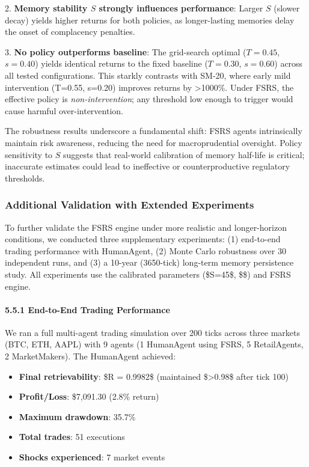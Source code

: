 \documentclass[11pt]{article}
\begin{document}
{{2. \textbf{Memory stability \(S\) strongly influences performance}: Larger \(S\) (slower decay) yields higher returns for both policies, as longer-lasting memories delay the onset of complacency penalties.

3. \textbf{No policy outperforms baseline}: The grid-search optimal (\(T=0.45\), \(s=0.40\)) yields identical returns to the fixed baseline (\(T=0.30\), \(s=0.60\)) across all tested configurations. This starkly contrasts with SM-20, where early mild intervention (T=0.55, s=0.20) improves returns by >1000\%. Under FSRS, the effective policy is \textit{non-intervention}; any threshold low enough to trigger would cause harmful over-intervention.

The robustness results underscore a fundamental shift: FSRS agents intrinsically maintain risk awareness, reducing the need for macroprudential oversight. Policy sensitivity to \(S\) suggests that real-world calibration of memory half-life is critical; inaccurate estimates could lead to ineffective or counterproductive regulatory thresholds.

\subsubsection{Additional Validation with Extended Experiments}

To further validate the FSRS engine under more realistic and longer-horizon conditions, we conducted three supplementary experiments: (1) end-to-end trading performance with HumanAgent, (2) Monte Carlo robustness over 30 independent runs, and (3) a 10-year (3650-tick) long-term memory persistence study. All experiments use the calibrated parameters (\$S=45\$, \$\$) and FSRS engine.

\paragraph{5.5.1 End-to-End Trading Performance}

We ran a full multi-agent trading simulation over 200 ticks across three markets (BTC, ETH, AAPL) with 9 agents (1 HumanAgent using FSRS, 5 RetailAgents, 2 MarketMakers). The HumanAgent achieved:

\begin{itemize}
  \item \textbf{Final retrievability}: \$R = 0.9982\$ (maintained \$>0.98\$ after tick 100)
  \item \textbf{Profit/Loss}: \$7,091.30 (2.8\% return)
  \item \textbf{Maximum drawdown}: 35.7\%
  \item \textbf{Total trades}: 51 executions
  \item \textbf{Shocks experienced}: 7 market events
\end{itemize}

}}
\end{document}
